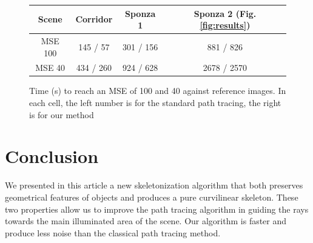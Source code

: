 \begin{figure}[tb]
\centering
\begin{tabular}{|c|c|c|c|}
\hline
Scene & Corridor & Sponza 1 & Sponza 2 (Fig. \ref{fig:results}) \\
\hline
MSE 100& 145 / 57 & 301 / 156 & 881 / 826 \\
\hline
MSE 40& 434 / 260 & 924 / 628 & 2678 / 2570 \\
\hline
\end{tabular}
\caption{Time (s) to reach an MSE of 100 and 40 against reference images. In each cell, the left number is for the standard path tracing, the right is for our method}
\label{tab:timing}
\end{figure}

\section{Conclusion}
We presented in this article a new skeletonization algorithm that both preserves geometrical features of objects and produces a pure curvilinear skeleton. These two properties allow us to improve the path tracing algorithm in guiding the rays towards the main illuminated area of the scene. Our algorithm is faster and produce less noise than the classical path tracing method.
